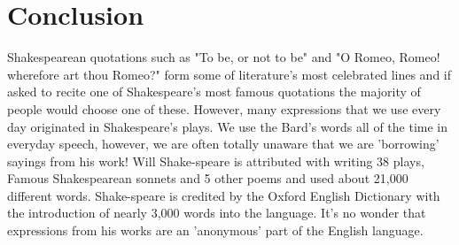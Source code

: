 \documentclass[12pt,a4paper,twocolumn]{article}
\begin{document}
\section*{Conclusion}
Shakespearean quotations such as "To be, or not to be" and "O Romeo, Romeo! wherefore art thou Romeo?" form some of literature's most celebrated lines and if asked to recite one of Shakespeare's most famous quotations the majority of people would choose one of these. However, many expressions that we use every day originated in Shakespeare's plays. We use the Bard's words all of the time in everyday speech, however, we are often totally unaware that we are 'borrowing' sayings from his work! Will Shake-speare is attributed with writing 38 plays, Famous Shakespearean sonnets and 5 other poems and used about 21,000 different words. Shake-speare is credited by the Oxford English Dictionary with the introduction of nearly 3,000 words into the language. It's no wonder that expressions from his works are an 'anonymous' part of the English language.
\end{document}
